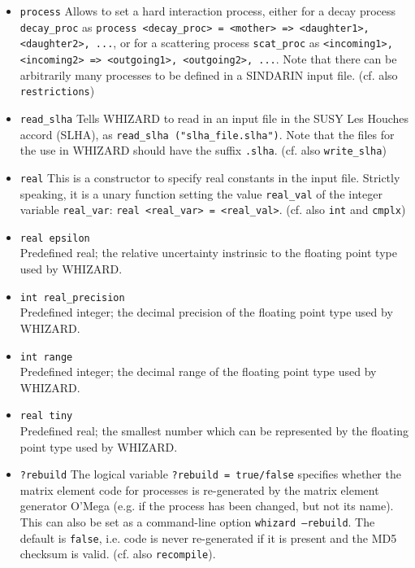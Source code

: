 \documentclass[12pt]{book}
\newcommand{\ttt}[1]{\texttt{#1}}
\begin{document}
\begin{itemize}
(cf. \ttt{record})
\item
\ttt{process} \newline
Allows to set a hard interaction process, either for a decay process
\ttt{decay\_proc} as \ttt{process <decay\_proc> = <mother>
  => <daughter1>, <daughter2>, ...}, or for a scattering process
\ttt{scat\_proc}  as \ttt{<incoming1>, <incoming2> 
  => <outgoing1>, <outgoing2>, ...}. Note that there can be
arbitrarily many processes to be defined in a 
SINDARIN input file. 
(cf. also \ttt{restrictions})
\item
\ttt{read\_slha} \newline
Tells WHIZARD to read in an input file in the SUSY Les Houches accord
(SLHA), as \ttt{read\_slha ("slha\_file.slha")}. Note that the files
for the use in WHIZARD should have the suffix \ttt{.slha}.
(cf. also \ttt{write\_slha})
\item
\ttt{real} \newline
This is a constructor to specify real constants in the input
file. Strictly speaking, it is a unary function setting the value
\ttt{real\_val} of the integer variable \ttt{real\_var}: 
\ttt{real <real\_var> = <real\_val>}. (cf. also \ttt{int} and
\ttt{cmplx}) 
\item
\ttt{real epsilon}\\
Predefined real; the relative uncertainty instrinsic to the floating point type
used by WHIZARD.
\item
\ttt{int real\_precision}\\
Predefined integer; the decimal precision of the floating point type used
by WHIZARD.
\item
\ttt{int range}\\
Predefined integer; the decimal range of the floating point type used
by WHIZARD.
\item
\ttt{real tiny}\\
Predefined real; the smallest number which can be represented by the floating
point type used by WHIZARD.
\item
\ttt{?rebuild} \newline
The logical variable \ttt{?rebuild = true/false} specifies whether
the matrix element code for processes is re-generated by the matrix
element generator O'Mega (e.g. if the process has been changed, but
not its name). This can also be set as a command-line option
\ttt{whizard --rebuild}. The default is \ttt{false}, i.e. code is
never re-generated if it is present and the MD5 checksum is valid.
(cf. also \ttt{recompile}).

\end{itemize}
\end{document}

